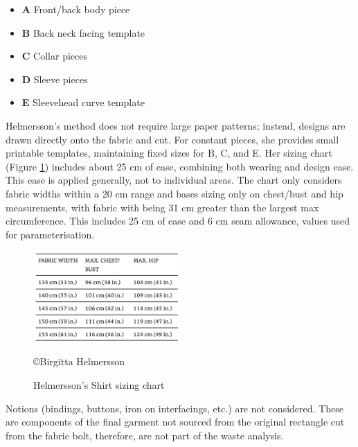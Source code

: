 \begin{itemize}
    \item \textbf{A} Front/back body piece
    \item \textbf{B} Back neck facing template
    \item \textbf{C} Collar pieces
    \item \textbf{D} Sleeve pieces
    \item \textbf{E} Sleevehead curve template
\end{itemize}
Helmersson's method does not require large paper patterns; instead, designs are drawn directly onto the fabric and cut. For constant pieces, she provides small printable templates, maintaining fixed sizes for B, C, and E. Her sizing chart (Figure \ref{fig:bh size chart}) includes about 25 cm of ease, combining both wearing and design ease. This ease is applied generally, not to individual areas. The chart only considers fabric widths within a 20 cm range and bases sizing only on chest/bust and hip measurements, with fabric with being 31 cm greater than the largest max circumference. This includes 25 cm of ease and 6 cm seam allowance, values used for parameterisation.
\begin{figure} [htb]
    \centering
    \includegraphics[width = 0.5\textwidth]{Images/BH size chart.png} 
    \caption{Helmersson's Shirt sizing chart}
    \copyright {Birgitta Helmersson}
    \label{fig:bh size chart}
\end{figure}
Notions (bindings, buttons, iron on interfacings, etc.) are not considered. These are components of the final garment not sourced from the original rectangle cut from the fabric bolt, therefore, are not part of the waste analysis.


